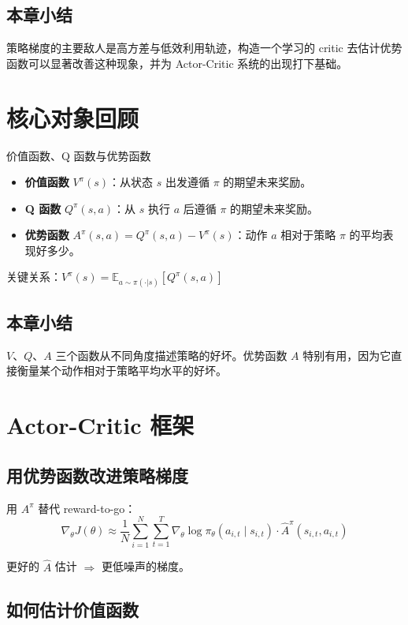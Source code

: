 \documentclass[a4paper]{article}
\begin{document}
\subsection{本章小结}

策略梯度的主要敌人是高方差与低效利用轨迹，构造一个学习的 critic 去估计优势函数可以显著改善这种现象，并为 Actor-Critic 系统的出现打下基础。

\section{核心对象回顾}

\begin{importantbox}{价值函数、Q 函数与优势函数}
\begin{itemize}
    \item \textbf{价值函数} $V^\pi(s)$：从状态 $s$ 出发遵循 $\pi$ 的期望未来奖励。
    \item \textbf{Q 函数} $Q^\pi(s, a)$：从 $s$ 执行 $a$ 后遵循 $\pi$ 的期望未来奖励。
    \item \textbf{优势函数} $A^\pi(s, a) = Q^\pi(s, a) - V^\pi(s)$：动作 $a$ 相对于策略 $\pi$ 的平均表现好多少。
\end{itemize}
关键关系：$V^\pi(s) = \mathbb{E}_{a \sim \pi(\cdot|s)}\left[Q^\pi(s, a)\right]$
\end{importantbox}

\subsection{本章小结}

$V$、$Q$、$A$ 三个函数从不同角度描述策略的好坏。优势函数 $A$ 特别有用，因为它直接衡量某个动作相对于策略平均水平的好坏。

\section{Actor-Critic 框架}

\subsection{用优势函数改进策略梯度}

用 $A^\pi$ 替代 reward-to-go：
$$\nabla_\theta J(\theta) \approx \frac{1}{N}\sum_{i=1}^{N}\sum_{t=1}^{T} \nabla_\theta \log \pi_\theta(a_{i,t} \mid s_{i,t}) \cdot \hat{A}^\pi(s_{i,t}, a_{i,t})$$

更好的 $\hat{A}$ 估计 $\Rightarrow$ 更低噪声的梯度。

\subsection{如何估计价值函数}
\end{document}
